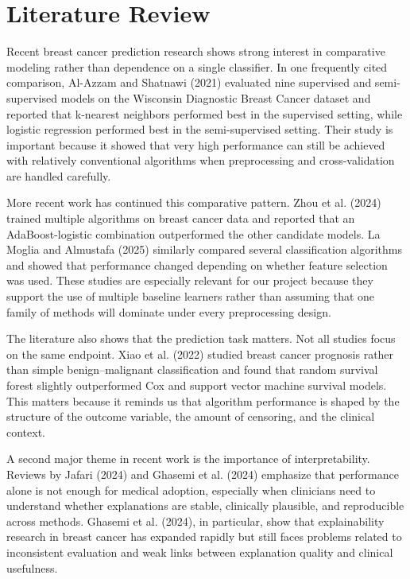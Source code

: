 \documentclass[conference]{IEEEtran}
\begin{document}
\section{Literature Review}
Recent breast cancer prediction research shows strong interest in comparative modeling rather than dependence on a single classifier. In one frequently cited comparison, Al-Azzam and Shatnawi (2021) evaluated nine supervised and semi-supervised models on the Wisconsin Diagnostic Breast Cancer dataset and reported that k-nearest neighbors performed best in the supervised setting, while logistic regression performed best in the semi-supervised setting. Their study is important because it showed that very high performance can still be achieved with relatively conventional algorithms when preprocessing and cross-validation are handled carefully.

More recent work has continued this comparative pattern. Zhou et al. (2024) trained multiple algorithms on breast cancer data and reported that an AdaBoost-logistic combination outperformed the other candidate models. La Moglia and Almustafa (2025) similarly compared several classification algorithms and showed that performance changed depending on whether feature selection was used. These studies are especially relevant for our project because they support the use of multiple baseline learners rather than assuming that one family of methods will dominate under every preprocessing design.

The literature also shows that the prediction task matters. Not all studies focus on the same endpoint. Xiao et al. (2022) studied breast cancer prognosis rather than simple benign--malignant classification and found that random survival forest slightly outperformed Cox and support vector machine survival models. This matters because it reminds us that algorithm performance is shaped by the structure of the outcome variable, the amount of censoring, and the clinical context.

A second major theme in recent work is the importance of interpretability. Reviews by Jafari (2024) and Ghasemi et al. (2024) emphasize that performance alone is not enough for medical adoption, especially when clinicians need to understand whether explanations are stable, clinically plausible, and reproducible across methods. Ghasemi et al. (2024), in particular, show that explainability research in breast cancer has expanded rapidly but still faces problems related to inconsistent evaluation and weak links between explanation quality and clinical usefulness.
\end{document}
